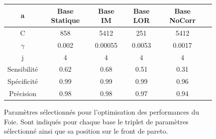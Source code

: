 \begin{figure}[h!]
\label{fig:paramsModFoie}
		\begin{tabular}{c| c c c c c}
  \hline
  a	& Base Statique	& Base IM	& Base LOR	& Base NoCorr	\\
  \hline
 C 	& 858		& 5412		& 251		& 5412		\\
\hline
$\gamma$& 0.002		& 0.00055	& 0.0053	& 0.0017	\\
\hline
j	& 4		& 4		& 4		& 4		\\
\hline
\hline
Sensibilité& 0.62	& 0.68		& 0.51		& 0.31	\\
\hline
Spécificité& 0.99	& 0.99		& 0.99		& 0.96		\\
\hline
Précision& 0.98		& 0.98		& 0.97		& 0.94		\\
\hline
 		\end{tabular}

\caption{Paramètres sélectionnés pour l'optimisation des performances du Foie. Sont indiqués pour chaque base le triplet de paramètres sélectionné ainsi que sa position sur le front de pareto.}
\end{figure}
